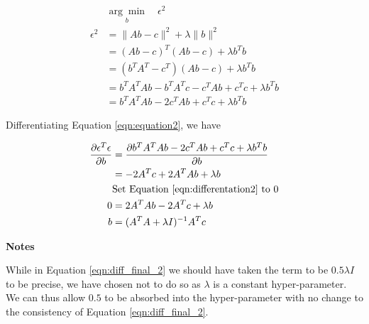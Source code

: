 \documentclass[]{article}
\begin{document}
\begin{align}
&\underset{b}{\arg\min} \quad \epsilon^2 \nonumber \\
\epsilon^2 &= \| Ab - c \|^2 + \lambda \| b \|^2 \nonumber \\
&= (Ab - c)^T(Ab - c) + \lambda b^Tb \nonumber \\
&= (b^TA^T - c^T)(Ab - c) + \lambda b^Tb \nonumber \\
&= b^TA^TAb - b^TA^Tc - c^TAb + c^Tc + \lambda b^Tb \nonumber \\
&= b^TA^TAb - 2c^TAb + c^Tc + \lambda b^Tb \label{eqn:equation2}
\end{align}

Differentiating Equation \ref{eqn:equation2}, we have

\begin{align}
\frac{\partial \epsilon^T\epsilon}{\partial b} 
	&= \frac{\partial b^TA^TAb - 2c^TAb + c^Tc + \lambda b^Tb}
		{\partial b} \nonumber \\
&= -2A^Tc + 2A^TAb + \lambda b \label{eqn:differentation2}\\
&\text{Set Equation \ref{eqn:differentation2} to 0} \nonumber \\ 
0 &= 2A^TAb - 2A^Tc + \lambda b \nonumber \\
b &= (A^TA + \lambda I)^{-1}A^Tc \label{eqn:diff_final_2}
\end{align}

\textbf{Notes} 

While in Equation \ref{eqn:diff_final_2} we should have taken the term to be $0.5\lambda I$ to be precise, we have chosen not to do so as $\lambda$ is a constant hyper-parameter. We can thus allow $0.5$ to be absorbed into the hyper-parameter with no change to the consistency of Equation \ref{eqn:diff_final_2}.
\end{document}
